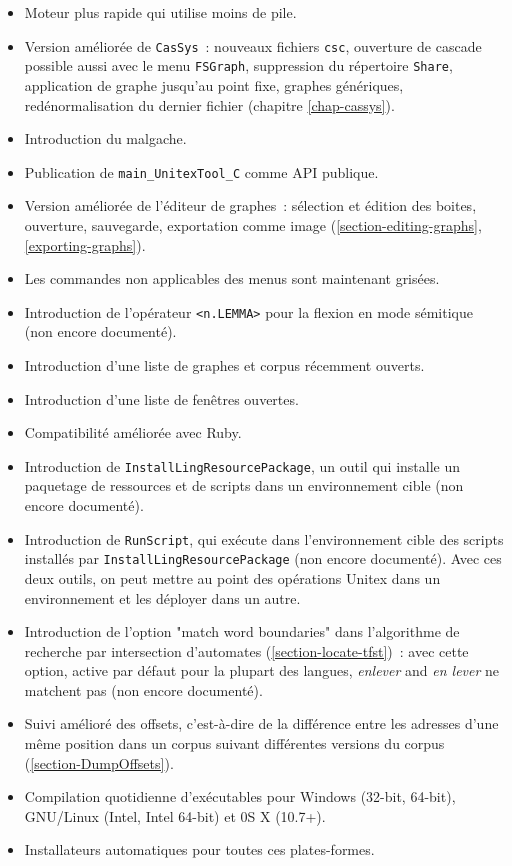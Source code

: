 \begin{itemize}

  \item Moteur plus rapide qui utilise moins de pile.
  \item Version améliorée de \verb$CasSys$~:
  nouveaux fichiers \verb$csc$,
  ouverture de cascade possible aussi avec le menu \verb$FSGraph$,
  suppression du répertoire \verb$Share$,
  application de graphe jusqu'au point fixe, graphes génériques,
  redénormalisation du dernier fichier
  (chapitre \ref{chap-cassys}).
  \item Introduction du malgache.
  \item Publication de \verb$main_UnitexTool_C$ comme API publique.
  \item Version améliorée de l'éditeur de graphes~: sélection et édition des boites, ouverture, sauvegarde, exportation comme image (\ref{section-editing-graphs}, \ref{exporting-graphs}).
  \item Les commandes non applicables des menus sont maintenant grisées.
  \item Introduction de l'opérateur \verb$<n.LEMMA>$ pour la flexion en mode sémitique (non encore documenté).
  \item Introduction d'une liste de graphes et corpus récemment ouverts.
  \item Introduction d'une liste de fenêtres ouvertes.
  \item Compatibilité améliorée avec Ruby.
  \item Introduction de \verb$InstallLingResourcePackage$, un outil qui installe un paquetage de ressources et de scripts dans un environnement cible (non encore documenté).
  \item Introduction de \verb$RunScript$, qui exécute dans l'environnement cible des scripts installés par \verb$InstallLingResourcePackage$ (non encore documenté). Avec ces deux outils, on peut mettre au point des opérations Unitex dans un environnement et les déployer dans un autre.
  \item Introduction de l'option "match word boundaries" dans l'algorithme de recherche par intersection d'automates (\ref{section-locate-tfst})~: avec cette option, active par défaut pour la plupart des langues, \textit{enlever} and \textit{en lever} ne matchent pas (non encore documenté).
  \item Suivi amélioré des offsets, c'est-à-dire de la différence entre les adresses d'une même position dans un corpus suivant différentes versions du corpus (\ref{section-DumpOffsets}).
  \item Compilation quotidienne d'exécutables pour Windows (32-bit, 64-bit), GNU/Linux (Intel, Intel 64-bit) et 0S X (10.7+).
  \item Installateurs automatiques pour toutes ces plates-formes.

\end{itemize}

